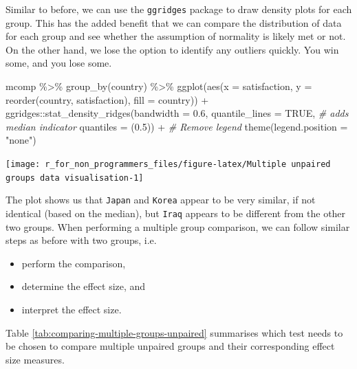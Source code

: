\documentclass[
]{book}
\newenvironment{Shaded}{\begin{snugshade}}{\end{snugshade}}
\newcommand{\AttributeTok}[1]{\textcolor[rgb]{0.77,0.63,0.00}{#1}}
\newcommand{\CommentTok}[1]{\textcolor[rgb]{0.56,0.35,0.01}{\textit{#1}}}
\newcommand{\ConstantTok}[1]{\textcolor[rgb]{0.00,0.00,0.00}{#1}}
\newcommand{\FloatTok}[1]{\textcolor[rgb]{0.00,0.00,0.81}{#1}}
\newcommand{\FunctionTok}[1]{\textcolor[rgb]{0.00,0.00,0.00}{#1}}
\newcommand{\NormalTok}[1]{#1}
\newcommand{\SpecialCharTok}[1]{\textcolor[rgb]{0.00,0.00,0.00}{#1}}
\newcommand{\StringTok}[1]{\textcolor[rgb]{0.31,0.60,0.02}{#1}}
\begin{document}
Similar to before, we can use the \texttt{ggridges} package to draw density plots for each group. This has the added benefit that we can compare the distribution of data for each group and see whether the assumption of normality is likely met or not. On the other hand, we lose the option to identify any outliers quickly. You win some, and you lose some.

\begin{Shaded}
\begin{Highlighting}[]
\NormalTok{mcomp }\SpecialCharTok{\%\textgreater{}\%}
  \FunctionTok{group\_by}\NormalTok{(country) }\SpecialCharTok{\%\textgreater{}\%}
  \FunctionTok{ggplot}\NormalTok{(}\FunctionTok{aes}\NormalTok{(}\AttributeTok{x =}\NormalTok{ satisfaction,}
             \AttributeTok{y =} \FunctionTok{reorder}\NormalTok{(country, satisfaction),}
             \AttributeTok{fill =}\NormalTok{ country)) }\SpecialCharTok{+}
\NormalTok{  ggridges}\SpecialCharTok{::}\FunctionTok{stat\_density\_ridges}\NormalTok{(}\AttributeTok{bandwidth =} \FloatTok{0.6}\NormalTok{,}
                                \AttributeTok{quantile\_lines =} \ConstantTok{TRUE}\NormalTok{,   }\CommentTok{\# adds median indicator}
                                \AttributeTok{quantiles =}\NormalTok{ (}\FloatTok{0.5}\NormalTok{)) }\SpecialCharTok{+}
  \CommentTok{\# Remove legend}
  \FunctionTok{theme}\NormalTok{(}\AttributeTok{legend.position =} \StringTok{"none"}\NormalTok{)}
\end{Highlighting}
\end{Shaded}

\begin{center}\texttt{[image: r\_for\_non\_programmers\_files/figure-latex/Multiple unpaired groups data visualisation-1]} \end{center}

The plot shows us that \texttt{Japan} and \texttt{Korea} appear to be very similar, if not identical (based on the median), but \texttt{Iraq} appears to be different from the other two groups. When performing a multiple group comparison, we can follow similar steps as before with two groups, i.e.

\begin{itemize}
\item
  perform the comparison,
\item
  determine the effect size, and
\item
  interpret the effect size.
\end{itemize}

Table \ref{tab:comparing-multiple-groups-unpaired} summarises which test needs to be chosen to compare multiple unpaired groups and their corresponding effect size measures.
\end{document}
